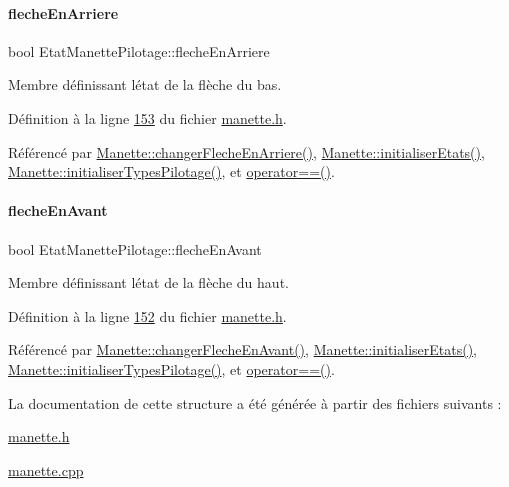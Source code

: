 \paragraph{\texorpdfstring{fleche\+En\+Arriere}{flecheEnArriere}}
{\footnotesize\ttfamily bool Etat\+Manette\+Pilotage\+::fleche\+En\+Arriere}



Membre définissant l\textquotesingle{}état de la flèche du bas. 



Définition à la ligne \hyperlink{manette_8h_source_l00153}{153} du fichier \hyperlink{manette_8h_source}{manette.\+h}.



Référencé par \hyperlink{manette_8cpp_source_l00524}{Manette\+::changer\+Fleche\+En\+Arriere()}, \hyperlink{manette_8cpp_source_l00023}{Manette\+::initialiser\+Etats()}, \hyperlink{manette_8cpp_source_l00040}{Manette\+::initialiser\+Types\+Pilotage()}, et \hyperlink{manette_8cpp_source_l00613}{operator==()}.

\mbox{\label{struct_etat_manette_pilotage_a12429b457b51cb45cc9d405f3a01bea6}} 
\paragraph{\texorpdfstring{fleche\+En\+Avant}{flecheEnAvant}}
{\footnotesize\ttfamily bool Etat\+Manette\+Pilotage\+::fleche\+En\+Avant}



Membre définissant l\textquotesingle{}état de la flèche du haut. 



Définition à la ligne \hyperlink{manette_8h_source_l00152}{152} du fichier \hyperlink{manette_8h_source}{manette.\+h}.



Référencé par \hyperlink{manette_8cpp_source_l00515}{Manette\+::changer\+Fleche\+En\+Avant()}, \hyperlink{manette_8cpp_source_l00023}{Manette\+::initialiser\+Etats()}, \hyperlink{manette_8cpp_source_l00040}{Manette\+::initialiser\+Types\+Pilotage()}, et \hyperlink{manette_8cpp_source_l00613}{operator==()}.



La documentation de cette structure a été générée à partir des fichiers suivants \+:\begin{DoxyCompactItemize}
\item 
\hyperlink{manette_8h}{manette.\+h}\item 
\hyperlink{manette_8cpp}{manette.\+cpp}\end{DoxyCompactItemize}

